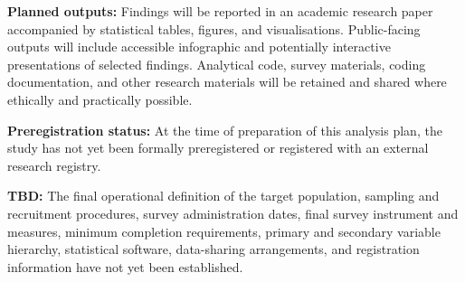 \textbf{Planned outputs:} Findings will be reported in an academic research paper accompanied by statistical tables, figures, and visualisations. Public-facing outputs will include accessible infographic and potentially interactive presentations of selected findings. Analytical code, survey materials, coding documentation, and other research materials will be retained and shared where ethically and practically possible.

\textbf{Preregistration status:} At the time of preparation of this analysis plan, the study has not yet been formally preregistered or registered with an external research registry.

\textbf{TBD:} The final operational definition of the target population, sampling and recruitment procedures, survey administration dates, final survey instrument and measures, minimum completion requirements, primary and secondary variable hierarchy, statistical software, data-sharing arrangements, and registration information have not yet been established.